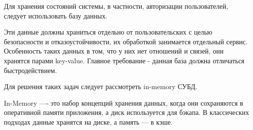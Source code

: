 %

Для хранения состояний системы, в частности, авторизации пользователей, следует использовать базу данных.  

Эти данные должны храниться отдельно от пользовательских с целью безопасности и отказоустойчивости, их обработкой занимается отдельный сервис.
Особенность таких данных в том, что у них нет отношений и связей, они хранятся парами key-value.
Главное требование - данная база должна отличаться быстродействием.

Для решения таких задач следует рассмотреть in-memory СУБД.

In-Memory —- это набор концепций хранения данных, когда они сохраняются в оперативной памяти приложения, а диск используется для бэкапа. В классических подходах данные хранятся на диске, а память — в кэше.

